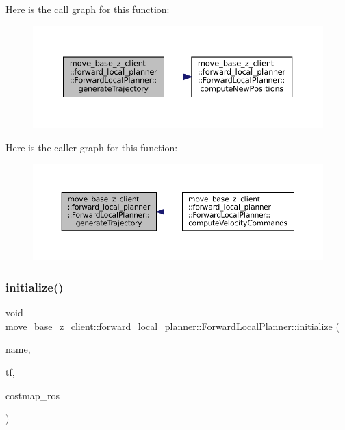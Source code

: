 Here is the call graph for this function\+:
\nopagebreak
\begin{figure}[H]
\begin{center}
\leavevmode
\includegraphics[width=350pt]{classmove__base__z__client_1_1forward__local__planner_1_1ForwardLocalPlanner_af0f99683368650fd03c04079afd8c806_cgraph}
\end{center}
\end{figure}
Here is the caller graph for this function\+:
\nopagebreak
\begin{figure}[H]
\begin{center}
\leavevmode
\includegraphics[width=350pt]{classmove__base__z__client_1_1forward__local__planner_1_1ForwardLocalPlanner_af0f99683368650fd03c04079afd8c806_icgraph}
\end{center}
\end{figure}
\mbox{\label{classmove__base__z__client_1_1forward__local__planner_1_1ForwardLocalPlanner_abd6a01631c5831ae609a8163dda93003}} 
\subsubsection{\texorpdfstring{initialize()}{initialize()}\hspace{0.1cm}{\footnotesize\ttfamily [1/3]}}
{\footnotesize\ttfamily void move\+\_\+base\+\_\+z\+\_\+client\+::forward\+\_\+local\+\_\+planner\+::\+Forward\+Local\+Planner\+::initialize (\begin{DoxyParamCaption}\item[{std\+::string}]{name,  }\item[{tf\+::\+Transform\+Listener $\ast$}]{tf,  }\item[{costmap\+\_\+2d\+::\+Costmap2\+D\+R\+OS $\ast$}]{costmap\+\_\+ros }\end{DoxyParamCaption})}



